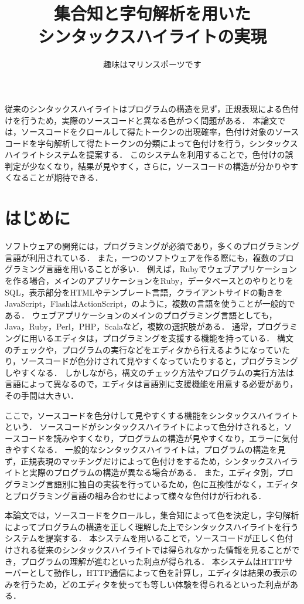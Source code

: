 \documentclass{cs-thesis}
\title{集合知と字句解析を用いた\\シンタックスハイライトの実現}
\author{趣味はマリンスポーツです}
\begin{document}
\titlepage

\abstract
 従来のシンタックスハイライトはプログラムの構造を見ず，正規表現による色付けを行うため，実際のソースコードと異なる色がつく問題がある．
 本論文では，ソースコードをクロールして得たトークンの出現確率，色付け対象のソースコードを字句解析して得たトークンの分類によって色付けを行う，シンタックスハイライトシステムを提案する．
 このシステムを利用することで，色付けの誤判定が少なくなり，結果が見やすく，さらに，ソースコードの構造が分かりやすくなることが期待できる．

\toc

 \section{はじめに}

 ソフトウェアの開発には，プログラミングが必須であり，多くのプログラミング言語が利用されている．
 また，一つのソフトウェアを作る際にも，複数のプログラミング言語を用いることが多い．
 例えば，Rubyでウェブアプリケーションを作る場合，メインのアプリケーションをRuby，データベースとのやりとりをSQL，表示部分をHTMLやテンプレート言語，クライアントサイドの動きをJavaScript，FlashはActionScript，のように，複数の言語を使うことが一般的である．
 ウェブアプリケーションのメインのプログラミング言語としても，Java，Ruby，Perl，PHP，Scalaなど，複数の選択肢がある．
 通常，プログラミングに用いるエディタは，プログラミングを支援する機能を持っている．
 構文のチェックや，プログラムの実行などをエディタから行えるようになっていたり，ソースコードが色分けされて見やすくなっていたりすると，プログラミングしやすくなる．
 しかしながら，構文のチェック方法やプログラムの実行方法は言語によって異なるので，エディタは言語別に支援機能を用意する必要があり，その手間は大きい．

 ここで，ソースコードを色分けして見やすくする機能をシンタックスハイライトという．
 ソースコードがシンタックスハイライトによって色分けされると，ソースコードを読みやすくなり，プログラムの構造が見やすくなり，エラーに気付きやすくなる．
 一般的なシンタックスハイライトは，プログラムの構造を見ず，正規表現のマッチングだけによって色付けをするため，シンタックスハイライトと実際のプログラムの構造が異なる場合がある．
 また，エディタ別，プログラミング言語別に独自の実装を行っているため，色に互換性がなく，エディタとプログラミング言語の組み合わせによって様々な色付けが行われる．

 本論文では，ソースコードをクロールし，集合知によって色を決定し，字句解析によってプログラムの構造を正しく理解した上でシンタックスハイライトを行うシステムを提案する．
 本システムを用いることで，ソースコードが正しく色付けされる従来のシンタックスハイライトでは得られなかった情報を見ることができ，プログラムの理解が進むといった利点が得られる．
 本システムはHTTPサーバーとして動作し，HTTP通信によって色を計算し，エディタは結果の表示のみを行うため，どのエディタを使っても等しい体験を得られるといった利点がある．
\end{document}
